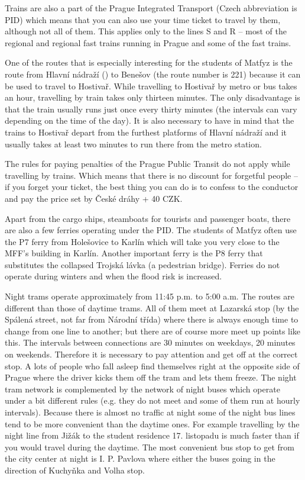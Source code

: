 Trains are also a part of the Prague Integrated Transport (Czech abbreviation is
PID) which means that you can also use your time ticket to travel by them,
although not all of them.
This applies only to the lines S and R -- most of the regional and regional fast
trains running in Prague and some of the fast trains.

One of the routes that is especially interesting for the students of Matfyz is
the route from Hlavní nádraží () to Benešov (the
route number is 221) because it can be used to travel to Hostivař.
While travelling to Hostivař by metro or bus takes an hour, travelling by train
takes only thirteen minutes. The only disadvantage is that the train usually
runs just once every thirty minutes (the intervals can vary depending on the
time of the day).
It is also necessary to have in mind that the trains to Hostivař depart from the
furthest platforms of Hlavní nádraží and it usually takes at least two minutes
to run there from the metro station.

The rules for paying penalties of the Prague Public Transit do not apply while
travelling by trains.
Which means that there is no discount for forgetful people -- if you forget your
ticket, the best thing you can do is to confess to the conductor and pay the
price set by České dráhy + 40 CZK.

Apart from the cargo ships, steamboats for tourists and passenger boats, there
are also a few ferries operating under the PID.
The students of Matfyz often use the P7 ferry from Holešovice to Karlín which
will take you very close to the MFF's building in Karlín.
Another important ferry is the P8 ferry that substitutes the collapsed Trojská
lávka (a pedestrian bridge).
Ferries do not operate during winters and when the flood risk is increased.

Night trams operate approximately from 11:45 p.m. to 5:00 a.m. The routes are
different than those of daytime trams.
All of them meet at Lazarská stop (by the Spálená street, not far from Národní
třída) where there is always enough time to change from one line to another; but
there are of course more meet up points like this.
The intervals between connections are 30 minutes on weekdays, 20 minutes on
weekends. Therefore it is necessary to pay attention and get off at the correct
stop.
A lots of people who fall asleep find themselves right at the opposite side of
Prague where the driver kicks them off the tram and lets them freeze.
The night tram network is complemented by the network of night buses which
operate under a bit different rules (e.g. they do not meet and some of them run
at hourly intervals).
Because there is almost no traffic at night some of the night bus lines tend to
be more convenient than the daytime ones.
For example travelling by the night line from Jižák to the student residence 17.
listopadu is much faster than if you would travel during the daytime.
The most convenient bus stop to get from the city center at night is I. P.
Pavlova where either the buses going in the direction of Kuchyňka and Volha
stop.

